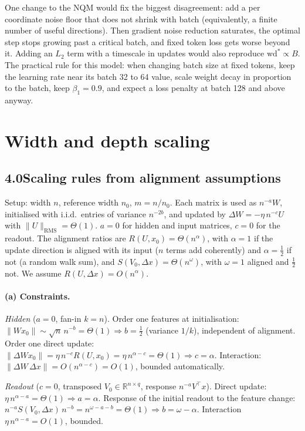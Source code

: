 \documentclass[10pt,letterpaper]{article}
\newcommand{\wds}{\ensuremath{\mathrm{wd}^{*}}}
\begin{document}
One change to the NQM would fix the biggest disagreement: add a per coordinate noise floor that does not shrink with batch (equivalently, a finite number of useful directions). Then gradient noise reduction saturates, the optimal step stops growing past a critical batch, and fixed token loss gets worse beyond it. Adding an $L_2$ term with a timescale in updates would also reproduce $\wds\propto B$. The practical rule for this model: when changing batch size at fixed tokens, keep the learning rate near its batch 32 to 64 value, scale weight decay in proportion to the batch, keep $\beta_1=0.9$, and expect a loss penalty at batch 128 and above anyway.

\section{Width and depth scaling}
\subsection*{4.0\quad Scaling rules from alignment assumptions}

Setup: width $n$, reference width $n_0$, $m=n/n_0$. Each matrix is used as $n^{-a}W$, initialised with i.i.d.\ entries of variance $n^{-2b}$, and updated by $\Delta W=-\eta\,n^{-c}U$ with $\lVert U\rVert_{\mathrm{RMS}}=\Theta(1)$. $a=0$ for hidden and input matrices, $c=0$ for the readout. The alignment ratios are $R(U,x_0)=\Theta(n^{\alpha})$, with $\alpha=1$ if the update direction is aligned with its input ($n$ terms add coherently) and $\alpha=\tfrac12$ if not (a random walk sum), and $S(V_0,\Delta x)=\Theta(n^{\omega})$, with $\omega=1$ aligned and $\tfrac12$ not. We assume $R(U,\Delta x)=O(n^{\alpha})$.

\paragraph{(a) Constraints.}
\emph{Hidden} ($a=0$, fan-in $k=n$). Order one features at initialisation: $\lVert Wx_0\rVert\sim\sqrt n\,n^{-b}=\Theta(1)\Rightarrow b=\tfrac12$ (variance $1/k$), independent of alignment. Order one direct update: $\lVert\Delta W x_0\rVert=\eta\,n^{-c}R(U,x_0)=\eta\,n^{\alpha-c}=\Theta(1)\Rightarrow c=\alpha$. Interaction: $\lVert\Delta W\,\Delta x\rVert=O(n^{\alpha-c})=O(1)$, bounded automatically.

\emph{Readout} ($c=0$, transposed $V_0\in\mathbb R^{n\times q}$, response $n^{-a}V^\top x$). Direct update: $\eta\,n^{\alpha-a}=\Theta(1)\Rightarrow a=\alpha$. Response of the initial readout to the feature change: $n^{-a}S(V_0,\Delta x)\,n^{-b}=n^{\omega-a-b}=\Theta(1)\Rightarrow b=\omega-\alpha$. Interaction $\eta\,n^{\alpha-a}=O(1)$, bounded.
\end{document}
